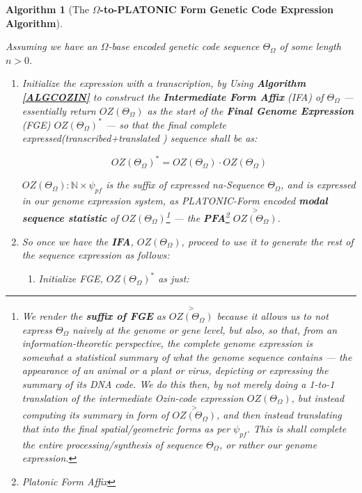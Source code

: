 \documentclass[a4paper, 18pt]{book} %
\newtheorem{alg}{Algorithm}
\begin{document}
\begin{alg}[The \textbf{$\Omega$-to-PLATONIC Form Genetic Code Expression Algorithm}]
\label{ALGCOZINPLATO}

Assuming we have an $\Omega$-base encoded genetic code sequence $\Theta_\Omega$ of some length $n > 0$.

\begin{enumerate}
\item{Initialize the expression with a transcription, by Using \textbf{Algorithm \ref{ALGCOZIN}} to construct the \textbf{Intermediate Form Affix} (IFA) of $\Theta_\Omega$ --- essentially return $OZ(\Theta_\Omega)$ as the start of the \textbf{Final Genome Expression} (FGE) $\boxed{OZ(\Theta_\Omega)}^*$ --- so that the final complete expressed(transcribed+translated ) sequence shall be as:

\begin{equation}
\label{EQTRANSLGENSEQ}
\boxed{OZ(\Theta_\Omega)}^* = OZ(\Theta_\Omega)\cdot\boxed{OZ(\Theta_\Omega)}
\end{equation}

$\boxed{OZ(\Theta_\Omega)}: \mathbb{N} \times \psi_{pf}$ is the suffix of expressed na-Sequence $\Theta_\Omega$, and is expressed in our genome expression system, as PLATONIC-Form encoded \textbf{modal sequence statistic} of $OZ(\Theta_\Omega)$\footnote{We render the \textbf{suffix of FGE} as $\overset{>}{OZ(\Theta_\Omega)}$ because it allows us to not express $\Theta_\Omega$ naively at the genome or gene level, but also, so that, from an information-theoretic perspective, the complete genome expression is somewhat a statistical summary of what the genome sequence contains --- the appearance of an animal or a plant or virus, depicting or expressing the summary of its DNA code. We do this then, by not merely doing a 1-to-1 translation of the intermediate Ozin-code expression $OZ(\Theta_\Omega)$, but instead computing its summary in form of $\overset{>}{OZ(\Theta_\Omega)}$, and then instead translating that into the final spatial/geometric forms as per $\psi_{pf}$. This is shall complete the entire processing/synthesis of sequence $\Theta_\Omega$, or rather our genome expression.} --- the \textbf{PFA}\footnote{Platonic Form Affix} $\overset{>}{OZ(\Theta_\Omega)}$.
}
\item{ So once we have the \textbf{IFA}, $OZ(\Theta_\Omega)$, proceed to use it to generate the rest of the sequence expression as follows: 
\begin{enumerate}
\item {Initialize FGE, $\boxed{OZ(\Theta_\Omega)}^*$ as just:\\

}
\end{enumerate}}
\end{enumerate}
\end{alg}
\end{document}
